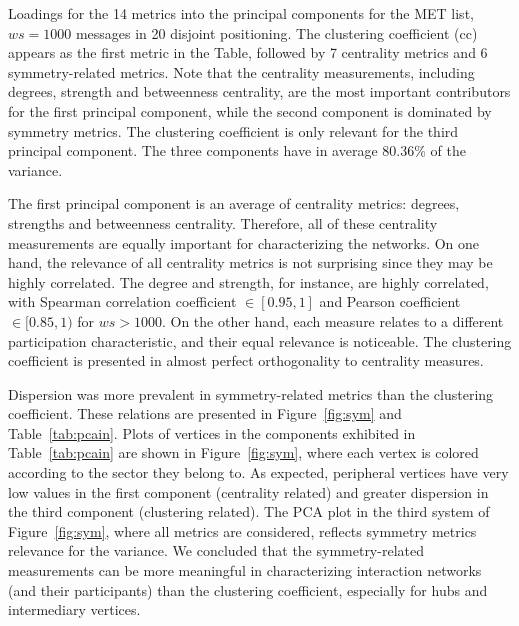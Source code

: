 \documentclass[%
 aip,
 jmp,%
 amsmath,amssymb,
 reprint,%
]{revtex4-1}
\begin{document}
\begin{table}[!h]
	\caption{Loadings for the 14 metrics into the principal components for the MET list, $ws=1000$ messages in 20 disjoint positioning. The clustering coefficient (cc) appears as the first metric in the Table, followed by 7 centrality metrics and 6 symmetry-related metrics. Note that the centrality measurements, including degrees, strength and betweenness centrality, are the most important contributors for the first principal component, while the second component is dominated by symmetry metrics. The clustering coefficient is only relevant for the third principal component. The three components have in average 80.36\% of the variance.}
	\footnotesize
	
\label{tab:pcain}
\end{table}

The first principal component is an average of centrality metrics: degrees, strengths and betweenness centrality. Therefore, all of these centrality measurements are equally important for characterizing the networks. On one hand, the relevance of all centrality metrics is not surprising since they may be highly correlated. The degree and strength, for instance, are highly correlated, with Spearman correlation coefficient $\in [0.95,1]$ and Pearson coefficient $\in [0.85,1)$ for $ws>1000$.
On the other hand, each measure relates to a different participation characteristic, and their equal relevance is noticeable.
The clustering coefficient is presented in almost perfect orthogonality to centrality measures.

Dispersion was more prevalent in symmetry-related metrics than the clustering coefficient. These relations are presented in Figure~\ref{fig:sym} and Table~\ref{tab:pcain}.
Plots of vertices in the components exhibited in Table~\ref{tab:pcain} are shown in Figure~\ref{fig:sym}, where each vertex is colored according to the sector they belong to. As expected, peripheral vertices have very low values in the first component (centrality related) and greater dispersion in the third component (clustering related).
The PCA plot in the third system of Figure~\ref{fig:sym}, where all metrics are considered, reflects symmetry metrics relevance for the variance.
We concluded that the symmetry-related measurements can be more meaningful in characterizing interaction networks (and their participants) than the clustering coefficient, especially for hubs and intermediary vertices.
\end{document}
